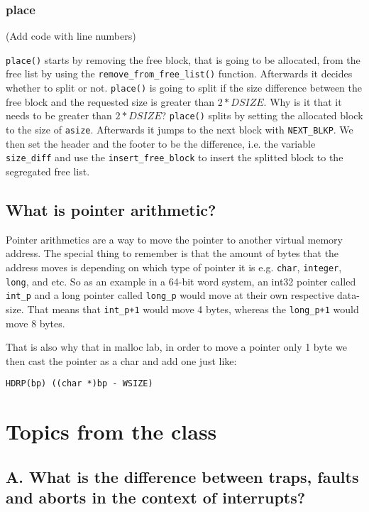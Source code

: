 \documentclass[11pt]{article}
\newcommand{\code}[1]{{\colorbox{lightgray!15}{\color{orange}\texttt{#1}}}}
\newcommand{\temp}[1]{{\color{red}#1}}
\begin{document}
\subsubsection{place}
\temp{(Add code with line numbers)}

\code{place()} starts by removing the free block, that is going to be allocated, from the free list by using the \code{remove\_from\_free\_list()} function. 
Afterwards it decides whether to split or not. \code{place()} is going to split if the size difference between the free block and the requested size is greater than $2 * DSIZE$.
\temp{Why is it that it needs to be greater than $2 * DSIZE$?}
\code{place()} splits by setting the allocated block to the size of \code{asize}. Afterwards it jumps to the next block with \code{NEXT\_BLKP}.
We then set the header and the footer to be the difference, i.e. the variable \code{size\_diff} and use the \code{insert\_free\_block} to insert the splitted block to the segregated free list.

\subsection{What is pointer arithmetic?}
Pointer arithmetics are a way to move the pointer to another virtual memory address. The special thing to remember is that the amount of bytes 
that the address moves is depending on which type of pointer it is e.g. \code{char}, \code{integer}, \code{long}, and etc.
So as an example in a 64-bit word system, an int32 pointer called \code{int\_p} and a long pointer called \code{long\_p} would move at their own respective data-size.
That means that \code{int\_p+1} would move 4 bytes, whereas the \code{long\_p+1} would move 8 bytes.

That is also why that in malloc lab, in order to move a pointer only 1 byte we then cast the pointer as a char and add one just like: 

\code{HDRP(bp) ((char *)bp - WSIZE)}

\section{Topics from the class}

\subsection{A. What is the difference between traps, faults and aborts in the context of interrupts?}
\end{document}
